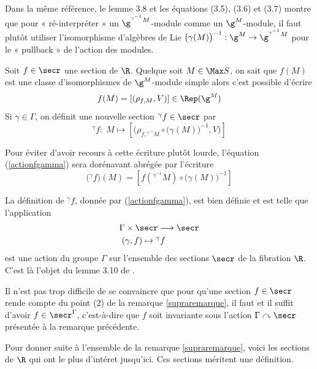\begin{Rem} Dans la même référence, le lemme 3.8 et les équations (3.5), (3.6) et (3.7) montre que pour « ré-interpréter » un $\g^{{}^{\gamma^{-1}}M}$-module comme un $\g^M$-module, il faut plutôt utiliser l'isomorphisme d'algèbres de Lie $\big(\gamma(M)\big)^{-1} : \g^M \rightarrow \g^{{}^{\gamma^{-1}}M}$ pour le « pullback » de l'action des modules.
\end{Rem}

Soit $f \in \secr$ une section de $\R$. Quelque soit $M \in \Max S$, on sait que $f(M)$ est une classe d'isomorphismes de $\g^{M}$-module simple alors c'est possible d'écrire
$$ f(M) = \left[(\rho_{f,M},V)\right] \in \Rep(\g^M) $$
Si $\gamma \in \Gamma$, on définit une nouvelle section ${}^\gamma f \in \secr$ par 
\begin{equation} \label{actionfgamma}
{}^\gamma f : \; M \longmapsto \left[\Big(\rho_{f,{}^{\gamma^{-1}}M} \circ \big(\gamma(M)\big)^{-1},V\Big)\right]
\end{equation}

\begin{Rem} Pour éviter d'avoir recours à cette écriture plutôt lourde, l'équation (\ref{actionfgamma}) sera dorénavant abrégée par l'écriture
$$ \big({}^\gamma f\big)(M) = \left[f({}^{\gamma^{-1}}M) \circ \big(\gamma(M)\big)^{-1}\right] $$ 
\end{Rem}

\begin{Rem} \label{actionsecr} La définition de ${}^\gamma f$, donnée par (\ref{actionfgamma}), est bien définie et est telle que l'application
\begin{align*}
&\Gamma \times \secr \longrightarrow \secr\\
&\;(\gamma,f) \mapsto {}^\gamma f
\end{align*}
est une action du groupe $\Gamma$ sur l'ensemble des sections $\secr$ de la fibration $\R$. C'est là l'objet du lemme 3.10 de \cite{LauTCA}.
\end{Rem}

Il n'est pas trop difficile de se convaincre que pour qu'une section $f \in \secr$ rende compte du point (2) de la remarque \ref{supraremarque}, il faut et il suffit d'avoir $f \in \secr^\Gamma$, c'est-à-dire que $f$ soit invariante sous l'action $\Gamma \curvearrowright \secr$ présentée à la remarque précédente.

Pour donner suite à l'ensemble de la remarque \ref{supraremarque}, voici les sections de $\R$ qui ont le plus d'intéret jusqu'ici. Ces sections méritent une définition.

